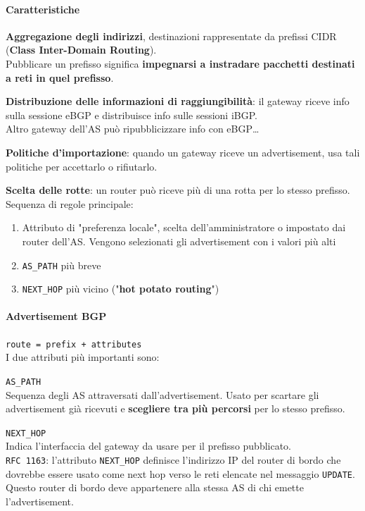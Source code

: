 \documentclass[10pt]{article}
\begin{document}
\paragraph{Caratteristiche}
\begin{list}{}{}
	\item \textbf{Aggregazione degli indirizzi}, destinazioni rappresentate da prefissi CIDR (\textbf{Class Inter-Domain Routing}).\\
	Pubblicare un prefisso significa \textbf{impegnarsi a instradare pacchetti destinati a reti in quel prefisso}.
	\item \textbf{Distribuzione delle informazioni di raggiungibilità}: il gateway riceve info sulla sessione eBGP e distribuisce info sulle sessioni iBGP.\\
	Altro gateway dell'AS può ripubblicizzare info con eBGP\ldots
	\item \textbf{Politiche d'importazione}: quando un gateway riceve un advertisement, usa tali politiche per accettarlo o rifiutarlo.
	\item \textbf{Scelta delle rotte}: un router può riceve più di una rotta per lo stesso prefisso. Sequenza di regole principale:
		\begin{enumerate}
			\item Attributo di "preferenza locale", scelta dell'amministratore o impostato dai router dell'AS. Vengono selezionati gli advertisement con i valori più alti
			\item \texttt{AS\_PATH} più breve
			\item \texttt{NEXT\_HOP} più vicino ("\textbf{hot potato routing}")
		\end{enumerate}
\end{list}
\paragraph{Advertisement BGP} \texttt{route = prefix + attributes}\\
I due attributi più importanti sono:
\begin{list}{}{}
	\item \texttt{AS\_PATH}\\
	Sequenza degli AS attraversati dall'advertisement. Usato per scartare gli advertisement già ricevuti e \textbf{scegliere tra più percorsi} per lo stesso prefisso.
	\item \texttt{NEXT\_HOP}\\
	Indica l'interfaccia del gateway da usare per il prefisso pubblicato.\\
	\texttt{RFC 1163}: l'attributo \texttt{NEXT\_HOP} definisce l'indirizzo IP del router di bordo che dovrebbe essere usato come next hop verso le reti elencate nel messaggio \texttt{UPDATE}. Questo router di bordo deve appartenere alla stessa AS di chi emette l'advertisement.
\end{list}
\pagebreak
\end{document}
